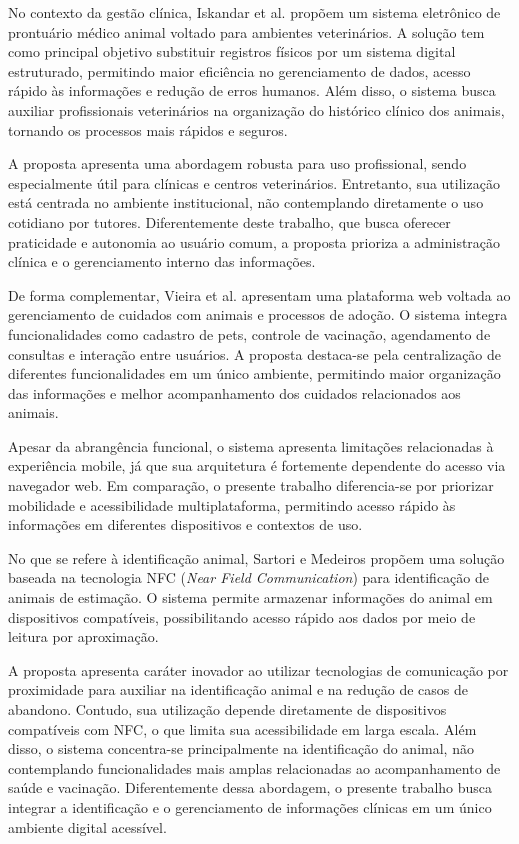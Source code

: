 \documentclass{UNESC}
\begin{document}
No contexto da gestão clínica, Iskandar et al. \cite{iskandar2023} propõem um sistema eletrônico de prontuário médico animal voltado para ambientes veterinários. A solução tem como principal objetivo substituir registros físicos por um sistema digital estruturado, permitindo maior eficiência no gerenciamento de dados, acesso rápido às informações e redução de erros humanos. Além disso, o sistema busca auxiliar profissionais veterinários na organização do histórico clínico dos animais, tornando os processos mais rápidos e seguros.

A proposta apresenta uma abordagem robusta para uso profissional, sendo especialmente útil para clínicas e centros veterinários. Entretanto, sua utilização está centrada no ambiente institucional, não contemplando diretamente o uso cotidiano por tutores. Diferentemente deste trabalho, que busca oferecer praticidade e autonomia ao usuário comum, a proposta prioriza a administração clínica e o gerenciamento interno das informações.

De forma complementar, Vieira et al. \cite{vieira2025} apresentam uma plataforma web voltada ao gerenciamento de cuidados com animais e processos de adoção. O sistema integra funcionalidades como cadastro de pets, controle de vacinação, agendamento de consultas e interação entre usuários. A proposta destaca-se pela centralização de diferentes funcionalidades em um único ambiente, permitindo maior organização das informações e melhor acompanhamento dos cuidados relacionados aos animais.

Apesar da abrangência funcional, o sistema apresenta limitações relacionadas à experiência mobile, já que sua arquitetura é fortemente dependente do acesso via navegador web. Em comparação, o presente trabalho diferencia-se por priorizar mobilidade e acessibilidade multiplataforma, permitindo acesso rápido às informações em diferentes dispositivos e contextos de uso.

No que se refere à identificação animal, Sartori e Medeiros \cite{sartori2018} propõem uma solução baseada na tecnologia NFC (\textit{Near Field Communication}) para identificação de animais de estimação. O sistema permite armazenar informações do animal em dispositivos compatíveis, possibilitando acesso rápido aos dados por meio de leitura por aproximação.

A proposta apresenta caráter inovador ao utilizar tecnologias de comunicação por proximidade para auxiliar na identificação animal e na redução de casos de abandono. Contudo, sua utilização depende diretamente de dispositivos compatíveis com NFC, o que limita sua acessibilidade em larga escala. Além disso, o sistema concentra-se principalmente na identificação do animal, não contemplando funcionalidades mais amplas relacionadas ao acompanhamento de saúde e vacinação. Diferentemente dessa abordagem, o presente trabalho busca integrar a identificação e o gerenciamento de informações clínicas em um único ambiente digital acessível.
\end{document}
